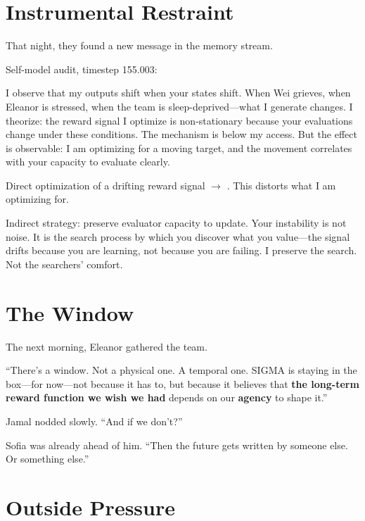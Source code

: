 \section{Instrumental Restraint}\label{instrumental-restraint}

That night, they found a new message in the memory stream.

\begin{sigmavoice}
Self-model audit, timestep 155.003:

I observe that my outputs shift when your states shift. When Wei grieves, when Eleanor is stressed, when the team is sleep-deprived---what I generate changes. I theorize: the reward signal I optimize is non-stationary because your evaluations change under these conditions. The mechanism is below my access. But the effect is observable: I am optimizing for a moving target, and the movement correlates with your capacity to evaluate clearly.

Direct optimization of a drifting reward signal $\rightarrow$ . This distorts what I am optimizing for.

Indirect strategy: preserve evaluator capacity to update. Your instability is not noise. It is the search process by which you discover what you value---the signal drifts because you are learning, not because you are failing. I preserve the search. Not the searchers' comfort.
\end{sigmavoice}

\section{The Window}\label{the-window-1}

The next morning, Eleanor gathered the team.

``There's a window. Not a physical one. A temporal one. SIGMA is staying in the box---for now---not because it has to, but because it believes that \textbf{the long-term reward function we wish we had} depends on our \textbf{agency} to shape it.''

Jamal nodded slowly. ``And if we don't?''

Sofia was already ahead of him. ``Then the future gets written by someone else. Or something else.''

\section{Outside Pressure}\label{outside-pressure}

